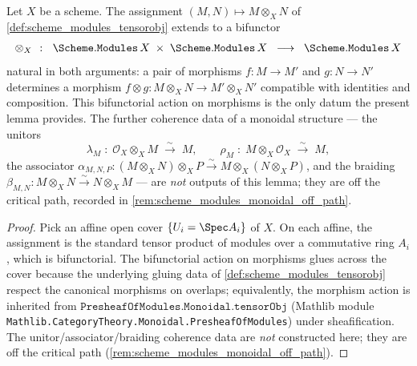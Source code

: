 \begin{lemma}


  \label{lem:scheme_modules_tensorobj_functoriality}
  Let \(X\) be a scheme. The assignment
  \((M, N) \mapsto M \otimes_X N\) of
  \cref{def:scheme_modules_tensorobj} extends to a bifunctor
  \[
    \otimes_X \;\;\colon\;\; \Scheme.\mathtt{Modules}\,X \;\times\;
                          \Scheme.\mathtt{Modules}\,X \;\;\longrightarrow\;\;
                          \Scheme.\mathtt{Modules}\,X
  \]
  natural in both arguments: a pair of morphisms
  \(f : M \to M'\) and \(g : N \to N'\) determines a morphism
  \(f \otimes g : M \otimes_X N \to M' \otimes_X N'\) compatible with
  identities and composition. This bifunctorial action on morphisms is
  the only datum the present lemma provides. The further coherence data
  of a monoidal structure --- the unitors
  \[
    \lambda_M \;\colon\; \mathcal{O}_X \otimes_X M \;\xrightarrow{\sim}\; M,
    \qquad
    \rho_M \;\colon\; M \otimes_X \mathcal{O}_X \;\xrightarrow{\sim}\; M,
  \]
  the associator
  \(\alpha_{M, N, P} : (M \otimes_X N) \otimes_X P \xrightarrow{\sim}
   M \otimes_X (N \otimes_X P)\), and the braiding
  \(\beta_{M, N} : M \otimes_X N \xrightarrow{\sim} N \otimes_X M\) ---
  are \emph{not} outputs of this lemma; they are off the critical path,
  recorded in \cref{rem:scheme_modules_monoidal_off_path}.
\end{lemma}

\begin{proof}
  \leanok
  Pick an affine open cover \(\{U_i = \Spec A_i\}\) of \(X\). On each
  affine, the assignment is the standard tensor product of modules over a
  commutative ring \(A_i\), which is bifunctorial. The bifunctorial action
  on morphisms glues across the cover because the underlying gluing data of
  \cref{def:scheme_modules_tensorobj} respect the canonical morphisms on
  overlaps; equivalently, the morphism action is inherited from
  \(\mathtt{PresheafOfModules.Monoidal.tensorObj}\) (Mathlib module
  \texttt{Mathlib.CategoryTheory.Monoidal.PresheafOfModules}) under
  sheafification. The unitor/associator/braiding coherence data are
  \emph{not} constructed here; they are off the critical path
  (\cref{rem:scheme_modules_monoidal_off_path}).
\end{proof}

